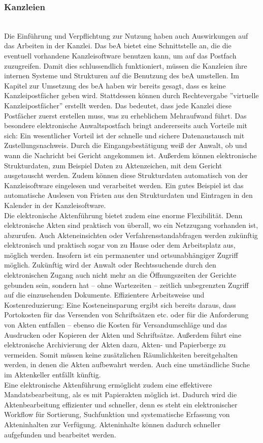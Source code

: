\subsubsection{Kanzleien}\hspace*{\fill} \\
Die Einführung und Verpflichtung zur Nutzung haben auch Auswirkungen auf das Arbeiten in der Kanzlei. Das beA bietet eine Schnittstelle an, die die eventuell vorhandene Kanzleisoftware benutzen kann, um auf das Postfach zuzugreifen. Damit dies schlussendlich funktioniert, müssen die Kanzleien ihre internen Systeme und Strukturen auf die Benutzung des beA umstellen. Im Kapitel zur Umsetzung des beA haben wir bereits gesagt, dass es keine Kanzleipostfächer geben wird. Stattdessen können durch Rechtevergabe ''virtuelle Kanzleipostfächer'' erstellt werden. Das bedeutet, dass jede Kanzlei diese Postfächer zuerst erstellen muss, was zu erheblichem Mehraufwand führt.  
Das besondere elektronische Anwaltspostfach bringt andererseits auch Vorteile mit sich: Ein wesentlicher Vorteil ist der schnelle und sichere Datenaustausch mit Zustellungsnachweis. Durch die Eingangsbestätigung weiß der Anwalt, ob und wann die Nachricht bei Gericht angekommen ist. Außerdem können elektronische Strukturdaten, zum Beispiel Daten zu Aktenzeichen, mit dem Gericht ausgetauscht werden. Zudem können diese Strukturdaten automatisch von der Kanzleisoftware eingelesen und verarbeitet werden. Ein gutes Beispiel ist das automatische Auslesen von Fristen aus den Strukturdaten und Eintragen in den Kalender in der Kanzleisoftware. \\
Die elektronische Aktenführung bietet zudem eine enorme Flexibilität. Denn elektronische Akten sind praktisch von überall, wo ein Netzzugang vorhanden ist, abzurufen. Auch Akteneinsichten oder Verfahrensstandabfragen werden zukünftig elektronisch und praktisch sogar von zu Hause oder dem Arbeitsplatz aus, möglich werden. Insofern ist ein permanenter und ortsunabhängiger Zugriff möglich. Zukünftig wird der Anwalt oder Rechtssuchende durch den elektronischen Zugang auch nicht mehr an die Öffnungszeiten der Gerichte gebunden sein, sondern hat – ohne Wartezeiten –  zeitlich unbegrenzten Zugriff auf die einzusehenden Dokumente.
Effizientere Arbeitsweise und Kostenreduzierung: Eine Kosteneinsparung ergibt sich bereits daraus, dass Portokosten für das Versenden von Schriftsätzen etc. oder für die Anforderung von Akten entfallen – ebenso die Kosten für Versandumschläge und das Ausdrucken oder Kopieren der Akten und Schriftsätze. Außerdem führt eine elektronische Archivierung der Akten dazu, Akten- und Papierberge zu vermeiden. Somit müssen keine zusätzlichen Räumlichkeiten bereitgehalten werden, in denen die Akten aufbewahrt werden. Auch eine umständliche Suche im Aktenkeller entfällt künftig. \\
Eine elektronische Aktenführung ermöglicht zudem eine effektivere Mandatsbearbeitung, als es mit Papierakten möglich ist. Dadurch wird die Aktenbearbeitung effizienter und schneller, denn es steht ein elektronischer Workflow für Sortierung, Suchfunktion und systematische Erfassung von Akteninhalten zur Verfügung. Akteninhalte können dadurch schneller aufgefunden und bearbeitet werden.


